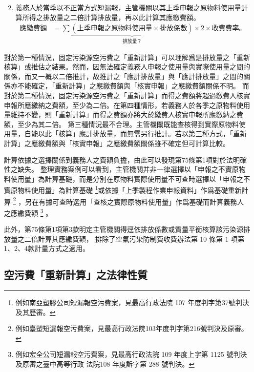 \documentclass[11pt,a4paper]{article}
\begin{document}
\begin{enumerate}
\begin{equation*}
         \end{equation*}
         \item 義務人於當季以不正當方式短漏報，主管機關以其上季申報之原物料使用量計算所得之排放量之二倍計算排放量，再以此計算其應繳費額。
         \begin{equation*}
            \begin{aligned}
               \text{應繳費額}
               &=\sum \underbrace{\left(\text{上季申報之原物料使用量}\times\text{排放係數}\right)}_{\textstyle\text{排放量？}}\times 2\times
               \text{收費費率。}
            \end{aligned}
            \end{equation*}
\end{enumerate}

對於第一種情況，固定污染源空污費之「重新計算」可以理解爲是排放量之「重新核算」或推估之結果。然而，因無法確定義務人申報之使用量與實際使用量之間的關係，而又一概以二倍推計，故推計之「應計排放量」與「應計排放量」之間的關係亦不能確定，「重新計算」之應繳費額與「核實申報」之應繳費額關係不明。
而對於第二種情況，固定污染源空污費之「重新計算」而得之費額將超過繳費人核實申報所應繳納之費額，至少為二倍。在第四種情形，若義務人於各季之原物料使用量維持不變，則「重新計算」而得之費額亦將大於繳費人核實申報所應繳納之費額，至少為其二倍。
第三種情況最不合理。主管機關既能查核得到實際原物料使用量，自能以此「核算」應計排放量，而無需另行推計。若以第三種方式，「重新計算」之應繳費額與「核實申報」之應繳費額關係雖不確定但可計算比較。

計算依據之選擇關係到義務人之費額負擔，由此可以發現第75條第1項對於法明確性之缺失。
整理實務案例可以看到，主管機關并非一律選擇以「申報之不實原物料使用量」為計算基礎，而是分別在原物料實際使用量不可查時選擇以「申報之不實原物料使用量」為計算基礎
\footnote{例如南亞塑膠公司短漏報空污費案，見最高行政法院 107 年度判字第37號判決及其歷審。}或依據「上季製程作業申報資料」作爲基礎重新計算
\footnote{例如臺塑短漏報空污費案，見最高行政法院103年度判字第216號判決及原審。}
，另在有據可查時選用「查核之實際原物料使用量」作爲基礎而計算義務人之應繳費額
\footnote{例如宏全公司短漏報空污費案，見最高行政法院 109 年度上字第 1125 號判決及原審之臺中高等行政
法院108 年度訴字第 288 號判決。}
。

此外，第75條第1項第3款明定主管機關得逕依排放係數或質量平衡核算該污染源排放量之二倍計算其應繳費額，
排除了空氣污染防制費收費辦法第 10 條第 1 項第1、2、4款計量方式之適用。

\subsection{空污費「重新計算」之法律性質}

\end{document}
